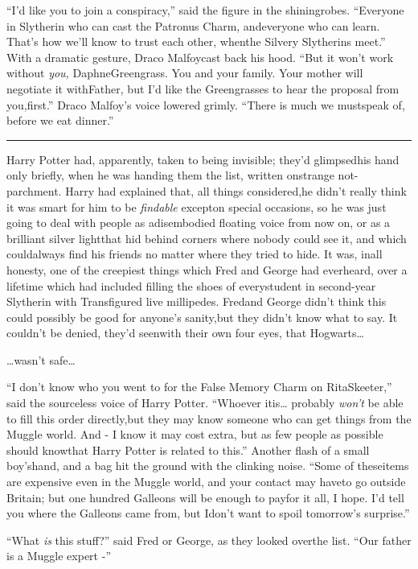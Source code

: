 ``I'd like you to join a conspiracy,'' said the figure in the shiningrobes. ``Everyone in Slytherin who can cast the Patronus Charm, andeveryone who can learn. That's how we'll know to trust each other, whenthe Silvery Slytherins meet.'' With a dramatic gesture, Draco Malfoycast back his hood. ``But it won't work without \emph{you,} DaphneGreengrass. You and your family. Your mother will negotiate it withFather, but I'd like the Greengrasses to hear the proposal from you,first.'' Draco Malfoy's voice lowered grimly. ``There is much we mustspeak of, before we eat dinner.''

\begin{center}\rule{3in}{0.4pt}\end{center}
Harry Potter had, apparently, taken to being invisible; they'd glimpsedhis hand only briefly, when he was handing them the list, written onstrange not-parchment. Harry had explained that, all things considered,he didn't really think it was smart for him to be \emph{findable} excepton special occasions, so he was just going to deal with people as adisembodied floating voice from now on, or as a brilliant silver lightthat hid behind corners where nobody could see it, and which couldalways find his friends no matter where they tried to hide. It was, inall honesty, one of the creepiest things which Fred and George had everheard, over a lifetime which had included filling the shoes of everystudent in second-year Slytherin with Transfigured live millipedes. Fredand George didn't think this could possibly be good for anyone's sanity,but they didn't know what to say. It couldn't be denied, they'd seenwith their own four eyes, that Hogwarts\ldots{}

\ldots{}wasn't safe\ldots{}

``I don't know who you went to for the False Memory Charm on RitaSkeeter,'' said the sourceless voice of Harry Potter. ``Whoever itis\ldots{} probably \emph{won't} be able to fill this order directly,but they may know someone who can get things from the Muggle world. And
- I know it may cost extra, but as few people as possible should knowthat Harry Potter is related to this.'' Another flash of a small boy'shand, and a bag hit the ground with the clinking noise. ``Some of theseitems are expensive even in the Muggle world, and your contact may haveto go outside Britain; but one hundred Galleons will be enough to payfor it all, I hope. I'd tell you where the Galleons came from, but Idon't want to spoil tomorrow's surprise.''

``What \emph{is} this stuff?'' said Fred or George, as they looked overthe list. ``Our father is a Muggle expert -''

